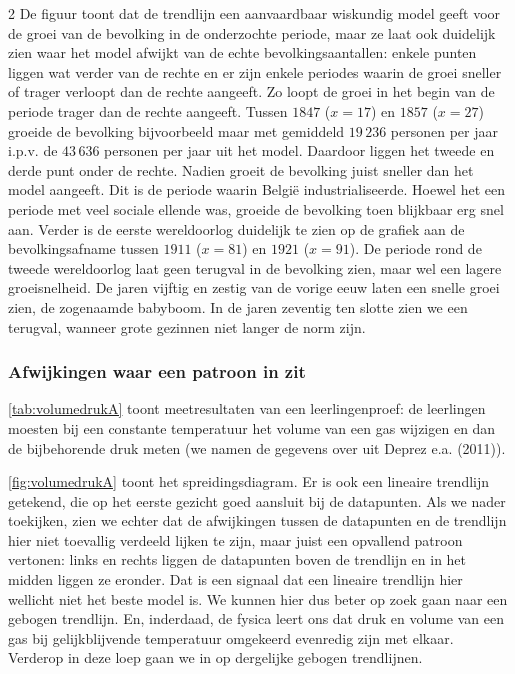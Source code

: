 \begin{multicols}{2}
De figuur toont dat de trendlijn een aanvaardbaar wiskundig model geeft voor de groei van de bevolking in de onderzochte periode, maar ze laat ook duidelijk zien waar het model afwijkt van de echte bevolkingsaantallen: enkele punten liggen wat verder van de rechte en er zijn enkele periodes waarin de groei sneller of trager verloopt dan de rechte aangeeft. Zo loopt de groei in het begin van de periode trager dan de rechte aangeeft. Tussen $1847$ ($x=17$) en $1857$ ($x=27$) groeide de bevolking bijvoorbeeld maar met gemiddeld $19\,236$ personen per jaar i.p.v. de $43\,636$ personen per jaar uit het model. Daardoor liggen het tweede en derde punt onder de rechte. Nadien groeit de bevolking juist sneller dan het model aangeeft. Dit is de periode waarin België industrialiseerde. Hoewel het een periode met veel sociale ellende was, groeide de bevolking toen blijkbaar erg snel aan. Verder is de eerste wereldoorlog duidelijk te zien op de grafiek aan de bevolkingsafname tussen $1911$ ($x=81$) en $1921$ ($x=91$). De periode rond de tweede wereldoorlog laat geen terugval in de bevolking zien, maar wel een lagere groeisnelheid. De jaren vijftig en zestig van de vorige eeuw laten een snelle groei zien, de zogenaamde babyboom. In de jaren zeventig ten slotte zien we een terugval, wanneer grote gezinnen niet langer de norm zijn.

    \subsubsection*{Afwijkingen waar een patroon in zit}

\autoref{tab:volumedrukA} toont meetresultaten van een leerlingenproef: de leerlingen moesten bij een constante temperatuur het volume van een gas wijzigen en dan de bijbehorende druk meten (we namen de gegevens over uit Deprez e.a. (2011)).


\autoref{fig:volumedrukA} toont het spreidingsdiagram. Er is ook een lineaire trendlijn getekend, die op het eerste gezicht goed aansluit bij de datapunten. Als we nader toekijken, zien we echter dat de afwijkingen tussen de datapunten en de trendlijn hier niet toevallig verdeeld lijken te zijn, maar juist een opvallend patroon vertonen: links en rechts liggen de datapunten boven de trendlijn en in het midden liggen ze eronder. Dat is een signaal dat een lineaire trendlijn hier wellicht niet het beste model is. We kunnen hier dus beter op zoek gaan naar een gebogen trendlijn. En, inderdaad, de fysica leert ons dat druk en volume van een gas bij gelijkblijvende temperatuur omgekeerd evenredig zijn met elkaar. Verderop in deze loep gaan we in op dergelijke gebogen trendlijnen.


\end{multicols}
